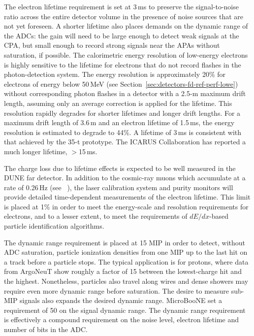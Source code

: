 The electron lifetime requirement is set at 3\,ms to preserve the
signal-to-noise ratio across the entire detector volume in the
presence of noise sources that are not yet foreseen.  A shorter
lifetime also places demands on the dynamic range of the ADCs: the
gain will need to be large enough to detect weak signals at the CPA,
but small enough to record strong signals near the APAs without
saturation, if possible.  The calorimetric energy resolution of
low-energy electrons is highly sensitive to the lifetime for electrons
that do not record flashes in the photon-detection system.  The energy
resolution is approximately 20\% for electrons of energy below 50\,MeV
(see Section~\ref{sec:detectors-fd-ref-perf-lowe}) without
corresponding photon flashes in a detector with a 2.5-m maximum drift
length, assuming only an average correction is applied for the
lifetime.  This resolution rapidly degrades for shorter lifetimes and
longer drift lengths.  For a maximum drift length of 3.6\,m and an
electron lifetime of 1.5\,ms, the energy resolution is estimated to
degrade to 44\%.  A lifetime of 3\,ms is consistent with that achieved
by the 35-t prototype.  The ICARUS Collaboration has reported a much
longer lifetime, $>$15\,ms\cite{Antonello:2014eha}.

The charge loss due to lifetime effects is expected to be well
measured in the DUNE far detector.  In addition to the cosmic-ray
muons which accumulate at a rate of 0.26\,Hz (see \anxrates~\cite{cdr-annex-rates}), the
laser calibration system and purity monitors will provide detailed
time-dependent measurements of the electron lifetime.  This
limit is placed at 1\% in order to meet the energy-scale and resolution
requirements for electrons, and to a lesser extent, to meet the requirements
of $dE/dx$-based particle identification algorithms.

The dynamic range requirement is placed at 15 MIP in order to detect,
without ADC saturation, particle ionization densities from one MIP up
to the last hit on a track before a particle stops.  The typical
application is for protons, where data from ArgoNeuT show roughly a
factor of 15 between the lowest-charge hit and the highest.
Nonetheless, particles also travel along wires and dense showers may
require even more dynamic range before saturation.  The desire to
measure sub-MIP signals also expands the desired dynamic range.
MicroBooNE set a requirement of 50 on the signal dynamic
range\cite{microboonetdr}.  The dynamic range requirement is
effectively a compound requirement on the noise level, electron
lifetime and number of bits in the ADC.

